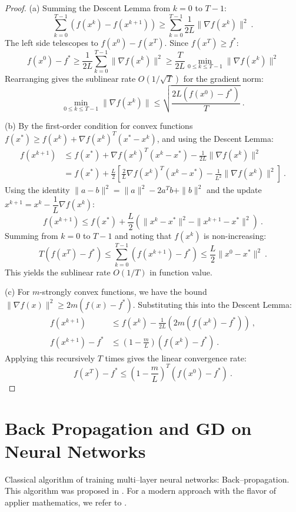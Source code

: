 \begin{proof}
(a) Summing the Descent Lemma from $k=0$ to $T-1$:
$$
    \sum_{k=0}^{T-1} (f(x^k) - f(x^{k+1})) \ge \sum_{k=0}^{T-1} \frac{1}{2L} \|\nabla f(x^k)\|^2  \ .$$
The left side telescopes to $f(x^0) - f(x^T)$. Since $f(x^T) \ge f^*$:
$$
    f(x^0) - f^* \ge \frac{1}{2L} \sum_{k=0}^{T-1} \|\nabla f(x^k)\|^2 \ge \frac{T}{2L} \min_{0 \le k \le T-1} \|\nabla f(x^k)\|^2 $$
Rearranging gives the sublinear rate $O(1/\sqrt{T})$ for the gradient norm:
$$
    \min_{0 \le k \le T-1} \|\nabla f(x^k)\| \le \sqrt{\frac{2L(f(x^0) - f^*)}{T}}  \ .$$

(b) By the first-order condition for convex functions $f(x^*) \ge f(x^k) + \nabla f(x^k)^T(x^* - x^k)$, and using the Descent Lemma:
\begin{align*}
    f(x^{k+1}) &\le f(x^*) + \nabla f(x^k)^T(x^k - x^*) - \frac{1}{2L} \|\nabla f(x^k)\|^2 \\
    &= f(x^*) + \frac{L}{2} \left[ \frac{2}{L} \nabla f(x^k)^T(x^k - x^*) - \frac{1}{L^2} \|\nabla f(x^k)\|^2 \right] \ .
\end{align*}
Using the identity $\|a-b\|^2 = \|a\|^2 - 2a^Tb + \|b\|^2$ and the update $x^{k+1} = x^k - \dfrac{1}{L}\nabla f(x^k)$:
$$
    f(x^{k+1}) \le f(x^*) + \frac{L}{2} (\|x^k - x^*\|^2 - \|x^{k+1} - x^*\|^2) \ .$$
Summing from $k=0$ to $T-1$ and noting that $f(x^k)$ is non-increasing:
$$
    T(f(x^T) - f^*) \le \sum_{k=0}^{T-1} (f(x^{k+1}) - f^*) \le \frac{L}{2} \|x^0 - x^*\|^2  \ .$$
This yields the sublinear rate $O(1/T)$ in function value.

(c) For $m$-strongly convex functions, we have the bound $\|\nabla f(x)\|^2 \ge 2m(f(x) - f^*)$.
Substituting this into the Descent Lemma:
\begin{align*}
    f(x^{k+1}) &\le f(x^k) - \frac{1}{2L} (2m(f(x^k) - f^*)) \ , \\
    f(x^{k+1}) - f^* &\le (1 - \frac{m}{L}) (f(x^k) - f^*) \ .
\end{align*}
Applying this recursively $T$ times gives the linear convergence rate:
$$
    f(x^T) - f^* \le \left(1 - \frac{m}{L}\right)^T (f(x^0) - f^*) \ . $$
\end{proof}

\section{Back Propagation and GD on Neural Networks}

Classical algorithm of training multi--layer neural networks: Back--propagation. This algorithm was proposed in \cite{HintonEtAlBackPropagation}. For a modern approach with the flavor of applier mathematics, we refer to \cite{HighamDeepLearningAppliedMath}. 



